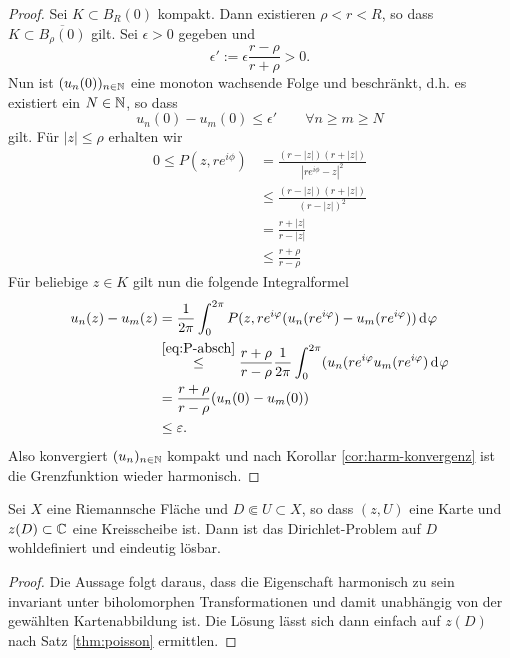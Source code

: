 \begin{proof}
  Sei $K \subset B_R(0)$ kompakt. Dann existieren $\rho < r < R$, so
  dass $K \subset \overline{B_\rho(0)}$ gilt. Sei $\epsilon > 0$ gegeben und
  \[
  \epsilon' := \epsilon \frac{r - \rho}{ r+ \rho} > 0.
  \]
  Nun ist $(u_n(0))_{n \in \mathbb{N}}$ eine monoton wachsende Folge und
  beschränkt, d.h. es existiert ein $N \in \mathbb{N}$, so dass
  \[
  u_n(0) - u_m(0) \leq \epsilon' \qquad \forall n \geq m \geq N
  \]
  gilt. Für $|z| \leq \rho$ erhalten wir
  \begin{align}
    0 \leq P(z, re^{i\phi}) & = \frac{(r - |z|)(r+|z|)}{|re^{i\phi} -
      z|^2} \nonumber\\
    & \leq \frac{(r- |z|)(r + |z|)}{(r - |z|)^2} \nonumber\\
    & = \frac{r + |z|}{r - |z|} \nonumber\\
    & \leq \frac{ r + \rho}{ r - \rho} \label{eq:P-absch} 
  \end{align}
  Für beliebige $z \in K$ gilt nun die folgende Integralformel
  \begin{align*}
    u_n(z) - u_m(z) & = \frac{1}{2\pi} \int_0^{2\pi} P(z, re^{i\phi}
    (u_n(re^{i\phi}) - u_m(re^{i\phi})) \d[\phi] \\
    & \stackrel{\eqref{eq:P-absch}}{\leq} \frac{r + \rho}{r - \rho}
    \frac{1}{2\pi} \int_0^{2\pi} (u_n(r e^{i\phi} u_m(re^{i\phi})
    \d[\phi] \\
    & = \frac{r+\rho}{r - \rho} (u_n(0) - u_m(0)) \\
    & \leq \epsilon.
  \end{align*}
  Also konvergiert $(u_n)_{n \in \mathbb{N}}$ kompakt und nach Korollar
  \ref{cor:harm-konvergenz} ist die Grenzfunktion wieder harmonisch.
\end{proof}

\begin{prop}
  \label{prop:harm-rf}
  Sei $X$ eine Riemannsche Fläche und $D \Subset U \subset X$, so dass
  $(z, U)$ eine Karte und $z(D) \subset \mathbb{C}$ eine Kreisscheibe
  ist. Dann ist das Dirichlet-Problem auf $D$ wohldefiniert und
  eindeutig lösbar.
\end{prop}

\begin{proof}
  Die Aussage folgt daraus, dass die Eigenschaft harmonisch zu sein
  invariant unter biholomorphen Transformationen und damit unabhängig
  von der gewählten Kartenabbildung ist. Die Lösung lässt sich dann
  einfach auf $z(D)$ nach Satz \ref{thm:poisson} ermittlen.
\end{proof}

